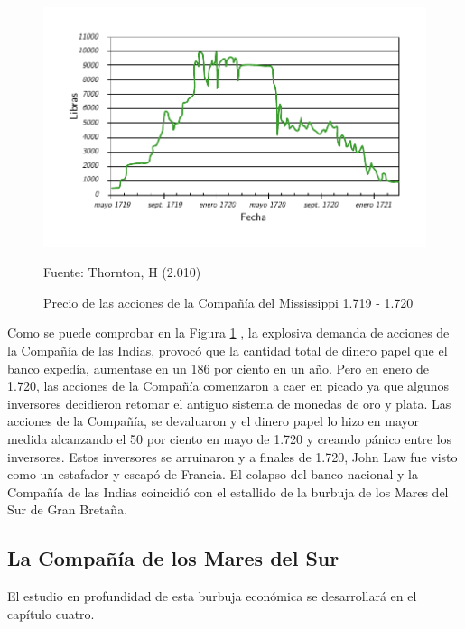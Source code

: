 \begin{figure}[!h] 
\caption{Precio de las acciones de la Compañía del Mississippi 1.719 - 1.720} 
\centering \includegraphics[width=150mm]{capitulos/graficos/preciosAccionesIndias} 
\label{fig:PrecioAccionesCompaniaMississippi} 

	\footnotesize
	Fuente: Thornton, H (2.010)

\end{figure}

Como se puede comprobar en la Figura \ref{fig:PrecioAccionesCompaniaMississippi} , la explosiva demanda de acciones de la Compañía de las Indias, provocó que la cantidad total de dinero papel que el banco expedía, aumentase en un 186 por ciento en un año. Pero en enero de 1.720, las acciones de la Compañía comenzaron a caer en picado ya que algunos inversores decidieron retomar el antiguo sistema de monedas de oro y plata. Las acciones de la Compañía, se devaluaron y el dinero papel lo hizo en mayor medida alcanzando el 50 por ciento en mayo de 1.720 y creando pánico entre los inversores. Estos inversores se arruinaron y a finales de 1.720, John Law fue visto como un estafador y escapó de Francia. El colapso del banco nacional y la Compañía de las Indias coincidió con el estallido de la burbuja de los Mares del Sur de Gran Bretaña.

\subsection{La Compañía de los Mares del Sur}  

El estudio en profundidad de esta burbuja económica se desarrollará en el capítulo cuatro.

